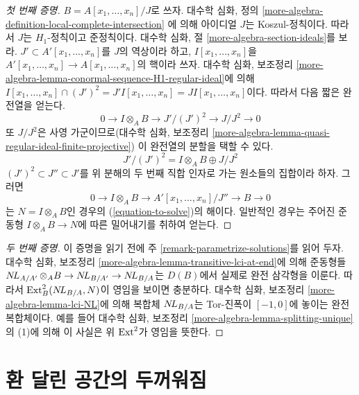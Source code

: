 \begin{proof}[첫 번째 증명]
$B=A[x_1,\ldots,x_n]/J$로 쓰자. 대수학 심화, 정의
\ref{more-algebra-definition-local-complete-intersection}
에 의해 아이디얼 $J$는 Koszul-정칙이다. 따라서 $J$는 $H_1$-정칙이고
준정칙이다. 대수학 심화, 절 \ref{more-algebra-section-ideals}를 보라.
$J'\subset A'[x_1,\ldots,x_n]$를 $J$의 역상이라 하고,
$I[x_1,\ldots,x_n]$을
$A'[x_1,\ldots,x_n]\to A[x_1,\ldots,x_n]$의 핵이라 쓰자.
대수학 심화, 보조정리
\ref{more-algebra-lemma-conormal-sequence-H1-regular-ideal}에 의해
$I[x_1, \ldots, x_n] \cap (J')^2 = J'I[x_1, \ldots, x_n] =
JI[x_1, \ldots, x_n]$이다. 따라서 다음 짧은 완전열을 얻는다.
$$
0 \to I \otimes_A B \to J'/(J')^2 \to J/J^2 \to 0
$$
또 $J/J^2$은 사영 가군이므로(대수학 심화, 보조정리
\ref{more-algebra-lemma-quasi-regular-ideal-finite-projective})
이 완전열의 분할을 택할 수 있다.
$$
J'/(J')^2 = I \otimes_A B \oplus J/J^2 
$$
$(J')^2\subset J''\subset J'$를 위 분해의 두 번째 직합 인자로 가는
원소들의 집합이라 하자. 그러면
$$
0 \to I \otimes_A B \to A'[x_1, \ldots, x_n]/J'' \to B \to 0
$$
는 $N=I\otimes_A B$인 경우의 (\ref{equation-to-solve})의 해이다.
일반적인 경우는 주어진 준동형 $I\otimes_A B\to N$에 따른
밀어내기를 취하여 얻는다.
\end{proof}

\begin{proof}[두 번째 증명]
이 증명을 읽기 전에 주 \ref{remark-parametrize-solutions}를 읽어 두자.
대수학 심화, 보조정리 \ref{more-algebra-lemma-transitive-lci-at-end}에 의해
준동형들 $\mathop{N\!L}\nolimits_{A/A'}\otimes_A B\to\mathop{N\!L}\nolimits_{B/A'}\to\mathop{N\!L}\nolimits_{B/A}$는
$D(B)$에서 실제로 완전 삼각형을 이룬다. 따라서
$\mathop{\mathrm{Ext}}\nolimits^2_B(\mathop{N\!L}\nolimits_{B/A},N)$이 영임을 보이면 충분하다. 대수학 심화,
보조정리 \ref{more-algebra-lemma-lci-NL}에 의해 복합체 $\mathop{N\!L}\nolimits_{B/A}$는
Tor-진폭이 $[-1,0]$에 놓이는 완전 복합체이다. 예를 들어 대수학 심화,
보조정리 \ref{more-algebra-lemma-splitting-unique}의 (1)에 의해 이 사실은
위 $\mathop{\mathrm{Ext}}\nolimits^2$가 영임을 뜻한다.
\end{proof}







\section{환 달린 공간의 두꺼워짐}
\label{section-thickenings-spaces}

